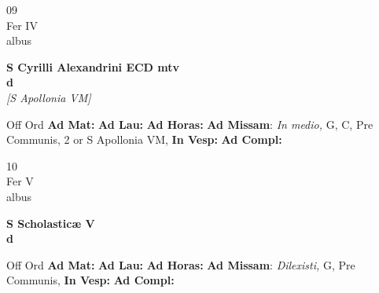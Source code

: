 \documentclass[10pt, openany]{book}
\begin{document}
        \begin{center}
            \begin{minipage}{3.5in}
                \vspace{2em}
                \begin{minipage}{0.5in}
                    {\Huge 09} \\
                    {\normalsize Fer IV} \\
                    {\normalsize albus}
                \end{minipage}
                \begin{minipage}{3.0in}
                    \textbf{ \large S Cyrilli Alexandrini ECD mtv \\
                    \textnormal{\normalsize d}} \\ \textit{[S Apollonia VM]} \\ 
                \end{minipage}
                \begin{justify}Off Ord
                    \textbf{Ad Mat: }
                    \textbf{Ad Lau: }
                    \textbf{Ad Horas: }\textbf{Ad Missam}: \textit{In medio,} G, C, Pre Communis, 2 or S Apollonia VM,  
                    \textbf{In Vesp: }
                    \textbf{Ad Compl: }
                \end{justify}
            \end{minipage}
        \end{center}
    
        \begin{center}
            \begin{minipage}{3.5in}
                \vspace{2em}
                \begin{minipage}{0.5in}
                    {\Huge 10} \\
                    {\normalsize Fer V} \\
                    {\normalsize albus}
                \end{minipage}
                \begin{minipage}{3.0in}
                    \textbf{ \large S Scholasticæ V \\
                    \textnormal{\normalsize d}} \\ 
                \end{minipage}
                \begin{justify}Off Ord
                    \textbf{Ad Mat: }
                    \textbf{Ad Lau: }
                    \textbf{Ad Horas: }\textbf{Ad Missam}: \textit{Dilexisti,} G, Pre Communis,  
                    \textbf{In Vesp: }
                    \textbf{Ad Compl: }
                \end{justify}
            \end{minipage}
        \end{center}
    
\end{document}
